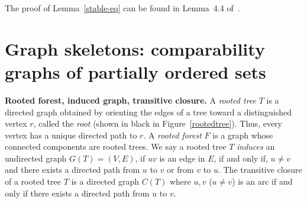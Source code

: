 \documentclass[11pt,reqno]{amsart}
\theoremstyle{definition}
\begin{document}
The proof of Lemma~\ref{stable-eq} can be found in Lemma~4.4 of~\cite{wu2025threshold}.

\section{Graph skeletons: comparability graphs of partially ordered sets}\label{sec:skeleton}

\noindent


\noindent
\textbf{Rooted forest, induced graph, transitive closure.}
A \textit{rooted tree} $T$ is a directed graph obtained by
orienting the edges of a tree toward a distinguished vertex
$r$, called the \textit{root}
(shown in black in Figure~\ref{rootedtree}).
Thus, every vertex has a unique directed path to $r$. A \textit{rooted forest} $F$ is a graph whose connected components are rooted trees.
We say a rooted tree $T$ \textit{induces} an undirected graph $G(T)=(V,E)$, if $uv$ is an edge in $E$, if and only if, $u\neq v$ and there exists a directed path from $u$ to $v$ or from $v$ to $u$.
The transitive closure of a rooted tree $T$ is a directed graph $C(T)$ where $u,v$ ($u\neq v$) is an arc if and only if there exists a directed path from $u$ to $v$.
\newline
\end{document}
